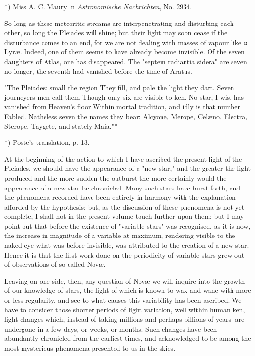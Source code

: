\documentclass[a4paper, 12pt, oneside, polutonikogreek, english]{article}
\begin{document}
*) Miss A. C. Maury in \emph{Astronomische Nachrichten}, No. 2934.

So long as these meteoritic streams are interpenetrating and disturbing each other, so long the Pleiades will shine; but their light may soon cease if the disturbance comes to an end, for we are not dealing with masses of vapour like α Lyræ. Indeed, one of them seems to have already become invisible. Of the seven daughters of Atlas, one has disappeared. The "septem radiantia sidera" are seven no longer, the seventh had vanished before the time of Aratus.

"The Pleiades: small the region 
They fill, and pale the light they dart. 
Seven journeyers men call them 
Though only six are visible to ken. 
No star, I wis, has vanished from Heaven's floor 
Within mortal tradition, and idly is that number 
Fabled. Natheless seven the names they bear: 
Alcyone, Merope, Celæno, Electra, 
Sterope, Taygete, and stately Maia."*

*) Poste's translation, p. 13.

At the beginning of the action to which I have ascribed the present light of the Pleiades, we should have the appearance of a "new star," and the greater the light produced and the more sudden the outburst the more certainly would the appearance of a new star be chronicled. Many such stars have burst forth, and the phenomena recorded have been entirely in harmony with the explanation afforded by the hypothesis; but, as the discussion of these phenomena is not yet complete, I shall not in the present volume touch further upon them; but I may point out that before the existence of "variable stars" was recognised, as it is now, the increase in magnitude of a variable at maximum, rendering visible to the naked eye what was before invisible, was attributed to the creation of a new star. Hence it is that the first work done on the periodicity of variable stars grew out of observations of so-called Novæ.

Leaving on one side, then, any question of Novæ we will inquire into the growth of our knowledge of stars, the light of which is known to wax and wane with more or less regularity, and see to what causes this variability has been ascribed. We have to consider those shorter periods of light variation, well within human ken, light changes which, instead of taking millions and perhaps billions of years, are undergone in a few days, or weeks, or months. Such changes have been abundantly chronicled from the earliest times, and acknowledged to be among the most mysterious phenomena presented to us in the skies.
\end{document}
